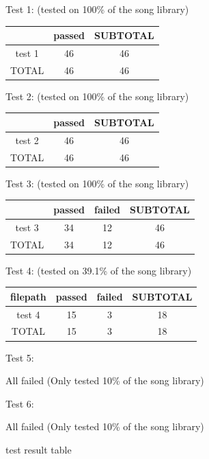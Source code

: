 \begin{figure}
Test 1: (tested on 100\% of the song library)

\begin{tabular}{|c|c|c|}
\hline
& passed & SUBTOTAL \\
\hline
test 1 & 46 & 46 \\
\hline
TOTAL & 46 & 46 \\
\hline
\end{tabular}

Test 2: (tested on 100\% of the song library)

\begin{tabular}{|c|c|c|}
\hline
& passed & SUBTOTAL \\
\hline
test 2 & 46 & 46 \\
\hline
TOTAL & 46 & 46 \\
\hline
\end{tabular}

Test 3: (tested on 100\% of the song library)

\begin{tabular}{|c|c|c|c|}
\hline
& passed & failed & SUBTOTAL \\
\hline
test 3 & 34 & 12 & 46 \\
\hline
TOTAL & 34 & 12 & 46 \\
\hline
\end{tabular}

Test 4: (tested on 39.1\% of the song library)

\begin{tabular}{|c|c|c|c|}
\hline
filepath & passed & failed & SUBTOTAL \\
\hline
test 4 & 15 & 3 & 18 \\
\hline
TOTAL & 15 & 3 & 18 \\
\hline
\end{tabular}

Test 5:

All failed (Only tested 10\% of the song library)

Test 6:

All failed (Only tested 10\% of the song library)

    \centering
    \caption{test result table}
    \label{fig:table_of_testing_result}
\end{figure}
